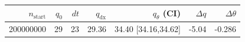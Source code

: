 \begin{tabular}{r r r r r r r}
\hline
$n_{\mathrm{start}}$ & $q_0$ & $dt$ & $q_{\mathrm{dx}}$ & $q_{\theta}$ (CI) & $\Delta q$ & $\Delta\theta$ \\
\hline
200000000 & 29 & 23 & 29.36 & 34.40 [34.16,34.62] & -5.04 & -0.286 \\
\hline
\end{tabular}
